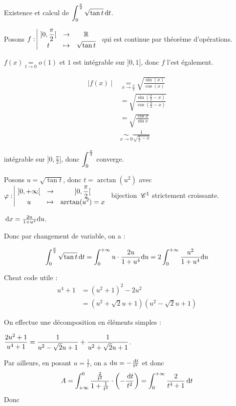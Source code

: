 \begin{exemple}
    Existence et calcul de $\displaystyle \int_0^{\frac \pi 2} \sqrt{\tan t} \,\mathrm{d}t$.

    Posons $f: \space \begin{array}{|ccc} \displaystyle ]0, \frac \pi 2[ & \to & \displaystyle \mathbb{R} \\ \displaystyle t & \mapsto & \displaystyle \sqrt{\tan t} \end{array}$ qui est continue par théorème d'opérations.

    $f(x) \underset{t \to 0 }{ = } o(1)$ et $1$ est intégrable sur $]0, 1]$, donc $f$ l'est également. 

    \begin{align}
        \mid f(x) \mid & \underset{x \to \frac \pi 2 }{ = } \sqrt{\frac {\sin(x)}{\cos(x)}} \\ 
        & = \sqrt{\frac{\sin(\frac \pi 2 - x)}{\cos(\frac \pi 2 - x)}} \\
        & = \sqrt{\frac{\cos x}{\sin x}} \\
        & \underset{x \to 0 }{ \sim } \frac 1 {\sqrt {\frac \pi 2 - x}}
    \end{align}

    intégrable sur $]0, \frac \pi 2]$, donc $\displaystyle \int_0^{\frac \pi 2}$ converge. 

    Posons $u = \sqrt{\tan t}$, donc $t = \arctan (u^2)$ avec 
    $\varphi: \space \begin{array}{|ccc} \displaystyle ]0, + \infty[ & \to & \displaystyle ]0, \frac \pi 2[ \\ \displaystyle u & \mapsto & \displaystyle \arctan (u^2) = x \end{array}$ bijection 
    $\,\mathscr C^{1}$ strictement croissante.

    $\,\mathrm{d}x = \frac {2u}{1 + u^4} \mathrm d u$.

    Donc par changement de variable, on a :

    $$\int_0^{\frac \pi 2} \sqrt{\tan t} \,\mathrm{d}t = \int_0^{+ \infty} u \cdot \frac{2u}{1 + u^4} \mathrm d u = 2 \int_0^{+ \infty} \frac{u^2}{1 + u^4} \mathrm d u$$

    Cheat code utile : 
    \begin{align}
        u^4 + 1 & = (u^2 + 1)^2 - 2 u^2 \\
        & = (u^2 + \sqrt 2 u + 1)(u^2 - \sqrt 2 u + 1)
    \end{align}

    On effectue une décomposition en éléments simples :

    $\displaystyle \frac{2u^2 + 1}{u^4 + 1} = \frac 1 {u^2 - \sqrt 2 u + 1} + \frac 1 {u^2 + \sqrt 2 u + 1}$.

    Par ailleurs, en posant $u = \frac 1 t$, on a $\mathrm d u = - \frac {\,\mathrm{d}t} {t^2}$ et donc 
    $$A = \int_{+ \infty  }^{0 } \frac{\frac{2 }{t^2 }}{1 + \frac{1 }{t^4 }} \cdot\left( - \frac {\,\mathrm{d}t} {t^2} \right) = \int_0^{+ \infty  } \frac{2 }{t^4 + 1 } \,\mathrm{d}t$$
    Donc 


\end{exemple}
